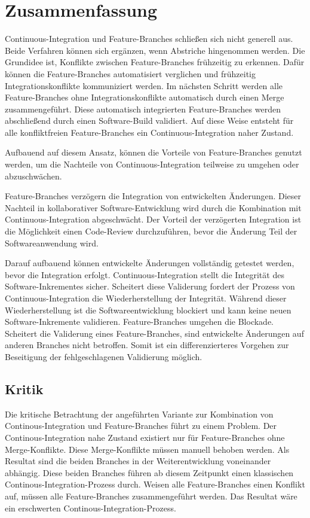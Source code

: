 \chapter{Zusammenfassung}

Continuous-Integration und Feature-Branches schließen sich nicht generell aus. Beide Verfahren können sich ergänzen, wenn Abstriche hingenommen werden. Die Grundidee ist, Konflikte zwischen Feature-Branches frühzeitig zu erkennen. Dafür können die Feature-Branches automatisiert verglichen und frühzeitig Integrationskonflikte kommuniziert werden. Im nächsten Schritt werden alle Feature-Branches ohne Integrationskonflikte automatisch durch einen Merge zusammengeführt. Diese automatisch integrierten Feature-Branches werden abschließend durch einen Software-Build validiert. Auf diese Weise entsteht für alle konfliktfreien Feature-Branches ein Continuous-Integration naher Zustand.

Aufbauend auf diesem Ansatz, können die Vorteile von Feature-Branches genutzt werden, um die Nachteile von Continuous-Integration teilweise zu umgehen oder abzuschwächen.

Feature-Branches verzögern die Integration von entwickelten Änderungen. Dieser Nachteil in kollaborativer Software-Entwicklung wird durch die Kombination mit Continuous-Integration abgeschwächt. Der Vorteil der verzögerten Integration ist die Möglichkeit einen Code-Review durchzuführen, bevor die Änderung Teil der Softwareanwendung wird. 

Darauf aufbauend können entwickelte Änderungen vollständig getestet werden, bevor die Integration erfolgt. Continuous-Integration stellt die Integrität des Software-Inkrementes sicher. Scheitert diese Validerung fordert der Prozess von Continuous-Integration die Wiederherstellung der Integrität. Während dieser Wiederherstellung ist die Softwareentwicklung blockiert und kann keine neuen Software-Inkremente validieren. Feature-Branches umgehen die Blockade. Scheitert die Validerung eines Feature-Branches, sind entwickelte Änderungen auf anderen Branches nicht betroffen. Somit ist ein differenzierteres Vorgehen zur Beseitigung der fehlgeschlagenen Validierung möglich.

\section{Kritik}

Die kritische Betrachtung der angeführten Variante zur Kombination von Continous\hyp{}Integration und Feature-Branches führt zu einem Problem. Der Continous-Integration nahe Zustand existiert nur für Feature-Branches ohne Merge-Konflikte. Diese Merge-Konflikte müssen manuell behoben werden. Als Resultat sind die beiden Branches in der Weiterentwicklung voneinander abhängig. Diese beiden Branches führen ab diesem Zeitpunkt einen \glqq klassischen\grqq{} Continous-Integration-Prozess durch. Weisen alle Feature-Branches einen Konflikt auf, müssen alle Feature-Branches zusammengeführt werden. Das Resultat wäre ein \glqq erschwerten\grqq{} Continous-Integration-Prozess.

